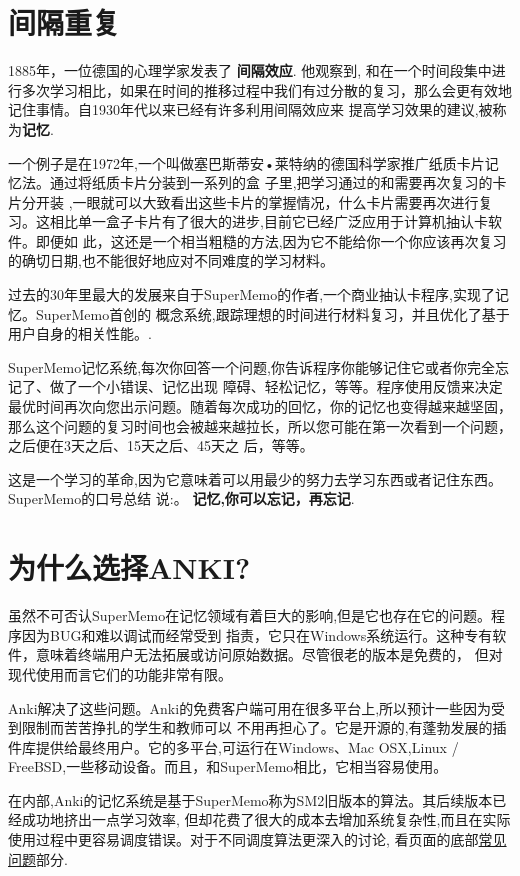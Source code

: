 \documentclass[a4paper]{book}
\begin{document}
	\section{间隔重复}\label{whatalgorithm}
	
	1885年，一位德国的心理学家发表了 \textbf{间隔效应}. 他观察到, 和在一个时间段集中进行多次学习相比，如果在时间的推移过程中我们有过分散的复习，那么会更有效地记住事情。自1930年代以来已经有许多利用间隔效应来 提高学习效果的建议,被称为\textbf{记忆}.
	
	一个例子是在1972年,一个叫做塞巴斯蒂安•莱特纳的德国科学家推广纸质卡片记忆法。通过将纸质卡片分装到一系列的盒 子里,把学习通过的和需要再次复习的卡片分开装 ,一眼就可以大致看出这些卡片的掌握情况，什么卡片需要再次进行复习。这相比单一盒子卡片有了很大的进步,目前它已经广泛应用于计算机抽认卡软件。即便如 此，这还是一个相当粗糙的方法,因为它不能给你一个你应该再次复习的确切日期,也不能很好地应对不同难度的学习材料。
	
	过去的30年里最大的发展来自于SuperMemo的作者,一个商业抽认卡程序,实现了记忆。SuperMemo首创的 概念系统,跟踪理想的时间进行材料复习，并且优化了基于用户自身的相关性能。.
	
	SuperMemo记忆系统,每次你回答一个问题,你告诉程序你能够记住它或者你完全忘记了、做了一个小错误、记忆出现 障碍、轻松记忆，等等。程序使用反馈来决定最优时间再次向您出示问题。随着每次成功的回忆，你的记忆也变得越来越坚固， 那么这个问题的复习时间也会被越来越拉长，所以您可能在第一次看到一个问题，之后便在3天之后、15天之后、45天之 后，等等。
	
	这是一个学习的革命,因为它意味着可以用最少的努力去学习东西或者记住东西。SuperMemo的口号总结 说:。 \textbf{记忆,你可以忘记，再忘记}.
	
	\section{为什么选择ANKI?}
	虽然不可否认SuperMemo在记忆领域有着巨大的影响,但是它也存在它的问题。程序因为BUG和难以调试而经常受到 指责，它只在Windows系统运行。这种专有软件，意味着终端用户无法拓展或访问原始数据。尽管很老的版本是免费的， 但对现代使用而言它们的功能非常有限。
	
	Anki解决了这些问题。Anki的免费客户端可用在很多平台上,所以预计一些因为受到限制而苦苦挣扎的学生和教师可以 不用再担心了。它是开源的,有蓬勃发展的插件库提供给最终用户。它的多平台,可运行在Windows、Mac OSX,Linux / FreeBSD,一些移动设备。而且，和SuperMemo相比，它相当容易使用。
	
	在内部,Anki的记忆系统是基于SuperMemo称为SM2旧版本的算法。其后续版本已经成功地挤出一点学习效率, 但却花费了很大的成本去增加系统复杂性,而且在实际使用过程中更容易调度错误。对于不同调度算法更深入的讨论, 看页面的底部\hyperref[what-algorithm]{常见问题}部分.
	
\end{document}
